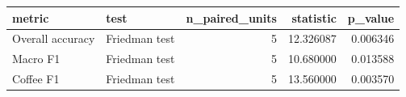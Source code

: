 \begin{tabular}{llrrr}
\toprule
metric & test & n_paired_units & statistic & p_value \\
\midrule
Overall accuracy & Friedman test & 5 & 12.326087 & 0.006346 \\
Macro F1 & Friedman test & 5 & 10.680000 & 0.013588 \\
Coffee F1 & Friedman test & 5 & 13.560000 & 0.003570 \\
\bottomrule
\end{tabular}
